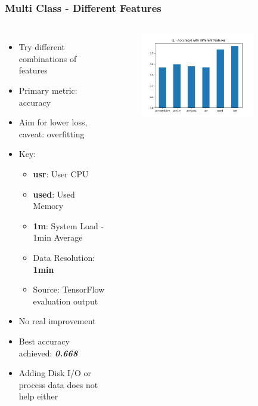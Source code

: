 \documentclass[aspectratio=169,11pt,hyperref={colorlinks=true}]{beamer}
\begin{document}
\begin{frame}
    \frametitle{Multi Class - Different Features}
    \begin{columns}
        \begin{itemize}
            \item{Try different combinations of features}
            \item{Primary metric: accuracy}
            \item{Aim for lower loss, caveat: overfitting}
            \item{Key:}
            \begin{itemize}
              \item{\textbf{usr}: User CPU}
              \item{\textbf{used}: Used Memory}
              \item{\textbf{1m}: System Load - 1min Average}
              \item{Data Resolution: \textbf{1min}}
              \item{Source: TensorFlow evaluation output}
            \end{itemize}
            \item{No real improvement}
            \item{Best accuracy achieved: \emph{\textbf{0.668}}}
            \item{Adding Disk I/O or process data does not help either}
        \end{itemize}
        \begin{center}
        \begin{figure}
          \includegraphics[width=0.8\textwidth,height=0.4\textheight]{graphs/accuracy_by_feature-node_provider_all.png}
        \end{figure}

\end{center}
\end{columns}
\end{frame}
\end{document}
